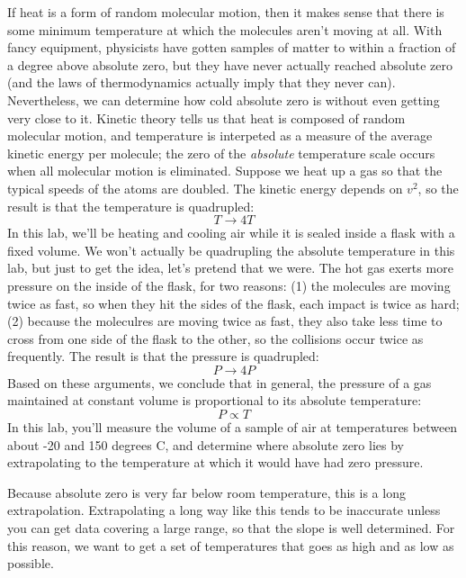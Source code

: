 If heat is a form of random molecular motion, then it makes
sense that there is some minimum temperature at which the
molecules aren't moving at all. With fancy equipment,
physicists have gotten samples of matter to within a
fraction of a degree above absolute zero, but they have
never actually reached absolute zero (and the laws of
thermodynamics actually imply that they never can).
Nevertheless, we can determine how cold absolute zero is
without even getting very close to it. Kinetic theory tells
us that heat is composed of random molecular motion, and
temperature is interpeted as a measure of the average
kinetic energy per molecule; the zero of the \emph{absolute}
temperature scale occurs when all molecular motion is eliminated.
Suppose we heat up a gas so that the typical speeds of
the atoms are doubled. The kinetic energy depends on $v^2$,
so the result is that the temperature is quadrupled:
\begin{equation*}
  T \rightarrow 4T
\end{equation*}
In this lab, we'll be heating and cooling air while it
is sealed inside a flask with a fixed volume. We won't
actually be quadrupling the absolute temperature in this
lab, but just to get the idea, let's pretend that we were.
The hot gas exerts more pressure on the inside of the flask,
for two reasons: (1) the molecules are moving twice as fast,
so when they hit the sides of the flask, each impact is
twice as hard; (2) because the moleculres are moving twice
as fast, they also take less time to cross from one side
of the flask to the other, so the collisions occur twice
as frequently. The result is that the pressure is quadrupled:
\begin{equation*}
  P \rightarrow 4P
\end{equation*}
Based on these arguments, we conclude that in general, the
pressure of a gas maintained at constant volume is proportional
to its absolute temperature:
\begin{equation*}
  P \propto T
\end{equation*}
In this lab, you'll measure
the volume of a sample of air at temperatures between about -20 and
150 degrees C, and determine where absolute zero lies by
extrapolating to the temperature at which it would
have had zero pressure.

Because absolute zero is very far below room temperature, this is a long extrapolation.
Extrapolating a long way like this tends to be inaccurate unless you can get data
covering a large range, so that the slope is well determined. For this reason,
we want to get a set of temperatures that goes as high and as low as possible.

